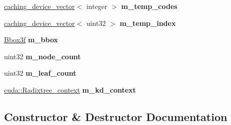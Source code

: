 \begin{DoxyCompactItemize}
\hyperlink{structcugar_1_1caching__device__vector}{caching\+\_\+device\+\_\+vector}$<$ integer $>$ {\bfseries m\+\_\+temp\+\_\+codes}
\item 
\mbox{\label{structcugar_1_1cuda_1_1_l_b_v_h__builder_a27d88ae14040cf89f954d5f522fdd5f8}} 
\hyperlink{structcugar_1_1caching__device__vector}{caching\+\_\+device\+\_\+vector}$<$ uint32 $>$ {\bfseries m\+\_\+temp\+\_\+index}
\item 
\mbox{\label{structcugar_1_1cuda_1_1_l_b_v_h__builder_add5c2e6c44d45b6358f66d92b506bd11}} 
\hyperlink{structcugar_1_1_bbox}{Bbox3f} {\bfseries m\+\_\+bbox}
\item 
\mbox{\label{structcugar_1_1cuda_1_1_l_b_v_h__builder_a2f092a6d3a49a450f0e57c48e71ee1df}} 
uint32 {\bfseries m\+\_\+node\+\_\+count}
\item 
\mbox{\label{structcugar_1_1cuda_1_1_l_b_v_h__builder_ae45d5655734f95b79d7b02cf96b8a28d}} 
uint32 {\bfseries m\+\_\+leaf\+\_\+count}
\item 
\mbox{\label{structcugar_1_1cuda_1_1_l_b_v_h__builder_a9379b12f1846a39568c2041b7a3492fe}} 
\hyperlink{structcugar_1_1cuda_1_1_radixtree__context}{cuda\+::\+Radixtree\+\_\+context} {\bfseries m\+\_\+kd\+\_\+context}
\end{DoxyCompactItemize}


\subsection{Constructor \& Destructor Documentation}
\mbox{\label{structcugar_1_1cuda_1_1_l_b_v_h__builder_ad2cafc8f7671ebbef3de1abeef7fa766}} 

